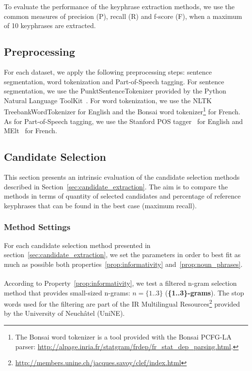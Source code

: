     To evaluate the performance of the keyphrase extraction methods, we use
    the common measures of precision (P), recall (R) and f-score (F), when a
    maximum of 10 keyphrases are extracted.

  \subsection{Preprocessing}
  \label{subsec:preprocessing}
    For each dataset, we apply the following preprocessing steps: sentence
    segmentation, word tokenization and Part-of-Speech tagging. For sentence
    segmentation, we use the PunktSentenceTokenizer provided by the Python
    Natural Language ToolKit~\cite[NLTK]{bird2009nltk}. For word tokenization,
    we use the NLTK TreebankWordTokenizer for English and the Bonsai word
    tokenizer\footnote{The Bonsai word tokenizer is a tool provided with the
    Bonsai PCFG-LA parser:
    \url{http://alpage.inria.fr/statgram/frdep/fr_stat_dep_parsing.html}.} for
    French. As for Part-of-Speech tagging, we use the Stanford
    POS tagger~\cite{toutanova2003stanfordpostagger} for English and
    MElt~\cite{denis2009melt} for French.

  \subsection{Candidate Selection}
  \label{subsec:candidate_extraction}

    This section presents an intrinsic evaluation of the candidate selection
    methods described in Section~\ref{sec:candidate_extraction}. The aim is to
    compare the methods in terms of quantity of selected candidates and
    percentage of reference keyphrases that can be found in the best case
    (maximum recall).

    \subsubsection{Method Settings}
    \label{subsubsec:method_settings}
      For each candidate selection method presented in
      section~\ref{sec:candidate_extraction}, we set the parameters in order to
      best fit as much as possible both properties~\ref{prop:informativity}
      and~\ref{prop:noun_phrases}.

      \paragraph{}
      According to Property~\ref{prop:informativity}, we test a filtered n-gram
      selection method that provides small-sized n-grams: $n = \{1..3\}$
      (\textbf{\{1..3\}-grams}). The stop words used for the filtering are part
      of the IR Multilingual
      Resources\footnote{\url{http://members.unine.ch/jacques.savoy/clef/index.html}}
      provided by the University of Neuchâtel (UniNE).

